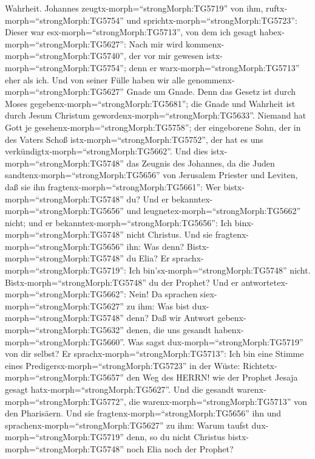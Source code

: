 Wahrheit.  Johannes zeugtx-morph=``strongMorph:TG5719'' von
ihm, ruftx-morph=``strongMorph:TG5754'' und
sprichtx-morph=``strongMorph:TG5723'': Dieser war
esx-morph=``strongMorph:TG5713'', von dem ich gesagt
habex-morph=``strongMorph:TG5627'': Nach mir wird
kommenx-morph=``strongMorph:TG5740'', der vor mir gewesen
istx-morph=``strongMorph:TG5754''; denn er
warx-morph=``strongMorph:TG5713'' eher als ich.  Und von
seiner Fülle haben wir alle genommenx-morph=``strongMorph:TG5627'' Gnade
um Gnade.  Denn das Gesetz ist durch Moses
gegebenx-morph=``strongMorph:TG5681''; die Gnade und Wahrheit ist durch
Jesum Christum gewordenx-morph=``strongMorph:TG5633''. 
Niemand hat Gott je gesehenx-morph=``strongMorph:TG5758''; der
eingeborene Sohn, der in des Vaters Schoß
istx-morph=``strongMorph:TG5752'', der hat es uns
verkündigtx-morph=``strongMorph:TG5662''.  Und dies
istx-morph=``strongMorph:TG5748'' das Zeugnis des Johannes, da die Juden
sandtenx-morph=``strongMorph:TG5656'' von Jerusalem Priester und
Leviten, daß sie ihn fragtenx-morph=``strongMorph:TG5661'': Wer
bistx-morph=``strongMorph:TG5748'' du?  Und er
bekanntex-morph=``strongMorph:TG5656'' und
leugnetex-morph=``strongMorph:TG5662'' nicht; und er
bekanntex-morph=``strongMorph:TG5656'': Ich
binx-morph=``strongMorph:TG5748'' nicht Christus.  Und sie
fragtenx-morph=``strongMorph:TG5656'' ihn: Was denn?
Bistx-morph=``strongMorph:TG5748'' du Elia? Er
sprachx-morph=``strongMorph:TG5719'': Ich
bin'sx-morph=``strongMorph:TG5748'' nicht.
Bistx-morph=``strongMorph:TG5748'' du der Prophet? Und er
antwortetex-morph=``strongMorph:TG5662'': Nein!  Da
sprachen siex-morph=``strongMorph:TG5627'' zu ihm: Was bist
dux-morph=``strongMorph:TG5748'' denn? Daß wir Antwort
gebenx-morph=``strongMorph:TG5632'' denen, die uns gesandt
habenx-morph=``strongMorph:TG5660''. Was sagst
dux-morph=``strongMorph:TG5719'' von dir selbst?  Er
sprachx-morph=``strongMorph:TG5713'': Ich bin eine Stimme eines
Predigersx-morph=``strongMorph:TG5723'' in der Wüste:
Richtetx-morph=``strongMorph:TG5657'' den Weg des HERRN! wie der Prophet
Jesaja gesagt hatx-morph=``strongMorph:TG5627''.  Und die
gesandt warenx-morph=``strongMorph:TG5772'', die
warenx-morph=``strongMorph:TG5713'' von den Pharisäern. 
Und sie fragtenx-morph=``strongMorph:TG5656'' ihn und
sprachenx-morph=``strongMorph:TG5627'' zu ihm: Warum taufst
dux-morph=``strongMorph:TG5719'' denn, so du nicht Christus
bistx-morph=``strongMorph:TG5748'' noch Elia noch der Prophet?
